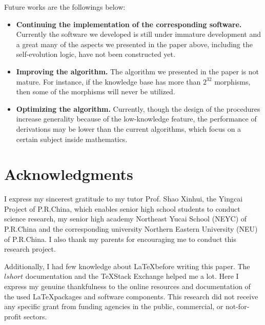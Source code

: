 \documentclass{aims}
\numberwithin{theorem}{section}	%
\numberwithin{axiom}{section}	%
\numberwithin{definition}{section}	%
\begin{document}
Future works are the followings below:
\begin{itemize}
	\item \textbf{Continuing the implementation of the corresponding software.} Currently the software we developed is still under immature development and a great many of the aspects we presented in the paper above, including the self-evolution logic, have not been constructed yet.
	\item  \textbf{Improving the algorithm.} The algorithm we presented in the paper is not mature. For instance, if the knowledge base has more than \(2^{32}\) morphisms, then some of the morphisms will never be utilized.
	\item \textbf{Optimizing the algorithm.} Currently, though the design of the procedures increase generality because of the low-knowledge feature, the performance of derivations may be lower than the current algorithms, which focus on a certain subject inside mathematics.
\end{itemize}

\section{Acknowledgments}
I express my sincerest gratitude to my tutor Prof. Shao Xinhui, the Yingcai Project of P.R.China, which enables senior high school students to conduct science research, my senior high academy Northeast Yucai School (NEYC) of P.R.China and the corresponding university Northern Eastern University (NEU) of P.R.China. I also thank my parents for encouraging me to conduct this research project.

Additionally, I had few knowledge about \LaTeX before writing this paper. The $lshort$ documentation and the \TeX Stack Exchange helped me a lot. Here I express my genuine thankfulness to the online resources and documentation of the used \LaTeX packages and software components. This research did not receive any specific grant from funding agencies in the public, commercial, or
not-for-profit sectors.



\end{document}
